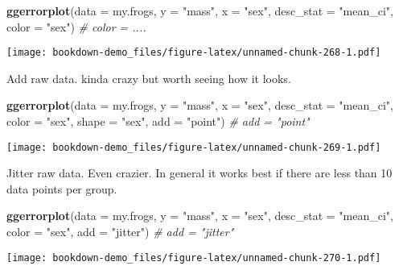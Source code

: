 \documentclass[]{book}
\newenvironment{Shaded}{\begin{snugshade}}{\end{snugshade}}
\newcommand{\KeywordTok}[1]{\textcolor[rgb]{0.13,0.29,0.53}{\textbf{#1}}}
\newcommand{\DataTypeTok}[1]{\textcolor[rgb]{0.13,0.29,0.53}{#1}}
\newcommand{\StringTok}[1]{\textcolor[rgb]{0.31,0.60,0.02}{#1}}
\newcommand{\CommentTok}[1]{\textcolor[rgb]{0.56,0.35,0.01}{\textit{#1}}}
\newcommand{\NormalTok}[1]{#1}
\theoremstyle{definition}
\theoremstyle{definition}
\theoremstyle{definition}
\theoremstyle{remark}
\begin{document}
\begin{Shaded}
\begin{Highlighting}[]
\KeywordTok{ggerrorplot}\NormalTok{(}\DataTypeTok{data =}\NormalTok{ my.frogs,}
          \DataTypeTok{y =} \StringTok{"mass"}\NormalTok{,}
          \DataTypeTok{x =} \StringTok{"sex"}\NormalTok{,}
          \DataTypeTok{desc_stat =} \StringTok{"mean_ci"}\NormalTok{,}
          \DataTypeTok{color =} \StringTok{"sex"}\NormalTok{)         }\CommentTok{# color = ....}
\end{Highlighting}
\end{Shaded}

\texttt{[image: bookdown-demo\_files/figure-latex/unnamed-chunk-268-1.pdf]}

Add raw data. kinda crazy but worth seeing how it looks.

\begin{Shaded}
\begin{Highlighting}[]
\KeywordTok{ggerrorplot}\NormalTok{(}\DataTypeTok{data =}\NormalTok{ my.frogs,}
          \DataTypeTok{y =} \StringTok{"mass"}\NormalTok{,}
          \DataTypeTok{x =} \StringTok{"sex"}\NormalTok{,}
          \DataTypeTok{desc_stat =} \StringTok{"mean_ci"}\NormalTok{,}
          \DataTypeTok{color =} \StringTok{"sex"}\NormalTok{,}
          \DataTypeTok{shape =} \StringTok{"sex"}\NormalTok{,}
          \DataTypeTok{add =} \StringTok{"point"}\NormalTok{)  }\CommentTok{# add = "point"}
\end{Highlighting}
\end{Shaded}

\texttt{[image: bookdown-demo\_files/figure-latex/unnamed-chunk-269-1.pdf]}

Jitter raw data. Even crazier. In general it works best if there are
less than 10 data points per group.

\begin{Shaded}
\begin{Highlighting}[]
\KeywordTok{ggerrorplot}\NormalTok{(}\DataTypeTok{data =}\NormalTok{ my.frogs,}
          \DataTypeTok{y =} \StringTok{"mass"}\NormalTok{,}
          \DataTypeTok{x =} \StringTok{"sex"}\NormalTok{,}
          \DataTypeTok{desc_stat =} \StringTok{"mean_ci"}\NormalTok{,}
          \DataTypeTok{color =} \StringTok{"sex"}\NormalTok{,}
          \DataTypeTok{add =} \StringTok{"jitter"}\NormalTok{)        }\CommentTok{# add = "jitter"}
\end{Highlighting}
\end{Shaded}

\texttt{[image: bookdown-demo\_files/figure-latex/unnamed-chunk-270-1.pdf]}
\end{document}
